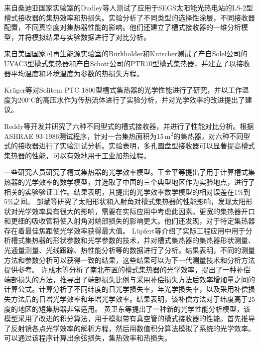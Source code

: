 来自桑迪亚国家实验室的Dudley等人\cite{Dudley1994}测试了应用于SEGS太阳能光热电站的LS-2型槽式接收器的集热效率和热损失。实验分析了不同类型的选择性涂层，不同接收器配置，不同真空度对集热器性能的影响。他们还建立了槽式接收器的一维分析模型，并将模拟结果与实验数据进行了对比分析。

来自美国国家可再生能源实验室的Burkholder和Kutscher\cite{Burkholder2009}测试了产自Solel公司的UVAC3型槽式集热器和产自Schott公司的PTR70型槽式集热器，并建立了以接收器平均温度和环境温度为参数的热损失方程。

Kr\"uger等\cite{Kruger2008}对Solitem PTC 1800型槽式集热器的光学性能进行了研究，并以工作温度为200$^\circ\mathrm{C}$的高压水作为传热流体进行了实验分析，并对光学效率的改进提出了建议。

Reddy等\cite{Reddy2015b}开发并研究了六种不同型式的槽式接收器，并进行了性能对比分析。根据ASHRAE 93-1986测试程序，针对一台集热面积为15$\,\mathrm{m^2}$的集热器，对六种不同型式的接收器进行了实验测试分析。实验表明，多孔圆盘型接收器可以显著提高槽式集热器的性能，可以有效地用于工业加热过程。


一些研究人员研究了槽式集热器的光学效率模型。王金平等\cite{Wang2016}提出了用于计算槽式集热器的光学效率的数学模型，并选取了中国的三个典型地区作为实验地点，进行了相关的实验验证工作。结果表明，其提出的光学效率数学模型的相对误差在1\%到5\%之间。
邹斌等\cite{Zou2017}研究了太阳形状和入射角对槽式集热器的性能影响，发现太阳形状对光学效率具有很大的影响，需要在实际应用中考虑此因素。更宽的集热器开口和更细的吸收管将使入射角对端部损失的影响更大。他们还发现，对于特定集热器存在着最佳焦距使光学效率获得最大值。
L\"upfert等\cite{Lupfert2006}介绍了实际工程应用中用于分析槽式集热器的形状参数和光学参数的技术，并对槽式集热器的集热器形状测量、光通量测量、光线跟踪、热性能分析等的数据进行了分析。结果表明，不同的测量方法和参数分析可以获得一致的结果，这些结果可以为下一代测量技术和分析方法提供参考。
许成木等\cite{Xu2014}分析了南北布置的槽式集热器的光学效率，提出了一种补偿端部损失的方法，推导出了端部损失比例与采用补偿损失方法后效率增加量之间的计算公式。计算分析了不同纬度的日光学损失率，年光学损失率，以及采用补偿损失方法后的日增光学效率和年增光学效率。结果表明，该补偿方法对于纬度高于25度的地区的短集热器非常适用。
黄卫东等\cite{Huang2012}提出了一种新的光学性能分析模型，该模型采用了改进的积分算法，用于模拟带有真空管的槽式接收器的性能。首先推导了反射镜各点光学效率的解析方程，然后用数值积分算法模拟了系统的光学效率。可以通过该程序计算出余弦损失，集热效率和热损失。

